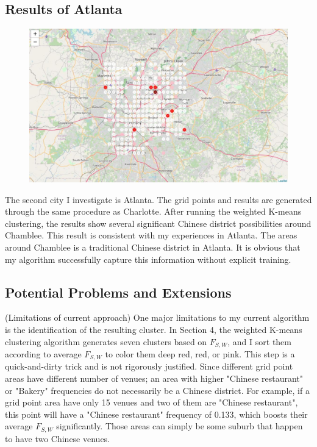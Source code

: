 \documentclass{article}
\begin{document}
\subsection{Results of Atlanta}

\begin{figure}[h!]
\includegraphics[width=1.0\textwidth]{cn5.jpg}
\centering
\end{figure}

The second city I investigate is Atlanta.
The grid points and results are generated through the same procedure as Charlotte.
After running the weighted K-means clustering, the results show several significant Chinese district possibilities around Chamblee.
This result is consistent with my experiences in Atlanta.
The areas around Chamblee is a traditional Chinese district in Atlanta.
It is obvious that my algorithm successfully capture this information without explicit training.

\newpage

\subsection{Potential Problems and Extensions}
(Limitations of current approach)
One major limitations to my current algorithm is the identification of the resulting cluster.
In Section 4, the weighted K-means clustering algorithm generates seven clusters based on $F_{S, W}$, and I sort them according to average $F_{S, W}$ to color them deep red, red, or pink.
This step is a quick-and-dirty trick and is not rigorously justified.
Since different grid point areas have different number of venues; an area with higher "Chinese restaurant" or "Bakery" frequencies do not necessarily be a Chinese district.
For example, if a grid point area have only 15 venues and two of them are "Chinese restaurant", this point will have a "Chinese restaurant" frequency of 0.133, which boosts their average $F_{S, W}$ significantly.
Those areas can simply be some suburb that happen to have two Chinese venues.
\end{document}

